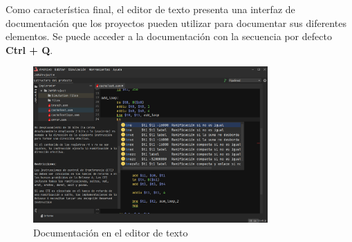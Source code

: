 Como característica final, el editor de texto presenta
una interfaz de documentación que los proyectos
pueden utilizar para documentar sus diferentes
elementos.
Se puede acceder a la documentación con la secuencia por defecto
\textbf{Ctrl + Q}.

\begin{figure}[H]
    \centering
    \includegraphics[width=0.8\textwidth]{images/base/jams-documentation}
    \caption{Documentación en el editor de texto}
    \label{fig:jams-documentacion}
\end{figure}